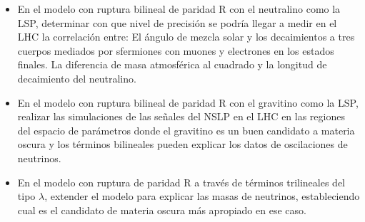 \begin{itemize}
\item 
\begin{proyecto}
  En el modelo con ruptura bilineal de paridad R con el neutralino como la LSP, determinar con
  que nivel de precisión se podría llegar a medir en el LHC la correlación entre:
El ángulo de mezcla solar y los decaimientos a tres cuerpos mediados
    por sfermiones con muones y electrones en los estados finales.
La diferencia de masa atmosférica al cuadrado y la longitud de
    decaimiento del neutralino.
\end{proyecto}

\item 
\begin{proyecto}
  En el modelo con ruptura bilineal de paridad R con el gravitino como
  la LSP, realizar las simulaciones de las señales del NSLP en el LHC
  en las regiones del espacio de parámetros donde el gravitino es un
  buen candidato a materia oscura y los términos bilineales pueden
  explicar los datos de oscilaciones de neutrinos.
\end{proyecto}

\item 
\begin{proyecto}
  En el modelo con ruptura de paridad R a través de términos
  trilineales del tipo $\lambda$, extender el modelo para explicar las
  masas de neutrinos, estableciendo cual es el candidato de materia
  oscura más apropiado en ese caso.
\end{proyecto}



\end{itemize}


